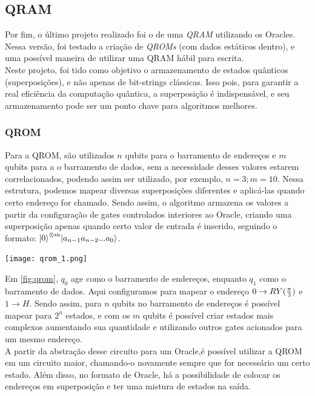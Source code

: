 \documentclass{article}
\begin{document}
\subsection{QRAM} \label{qram}
Por fim, o último projeto realizado foi o de uma \emph{QRAM} utilizando os Oracles. Nessa versão, foi testado a criação de \emph{QROMs} (com dados estáticos dentro), e uma possível maneira de utilizar uma QRAM hábil para escrita.\\
Neste projeto, foi tido como objetivo o armazenamento de estados quânticos (superposições), e não apenas de bit-strings clássicas. Isso pois, para garantir a real eficiência da computação quântica, a superposição é indispensável, e seu armazenamento pode ser um ponto chave para algoritmos melhores.

\subsubsection{QROM}
Para a QROM, são utilizados $n$ qubits para o barramento de endereços e $m$ qubits para a o barramento de dados, sem a necessidade desses valores estarem correlacionados, podendo assim ser utilizado, por exemplo, $n=3; m=10$. Nessa estrutura, podemos mapear diversas superposições diferentes e aplicá-las quando certo endereço for chamado. Sendo assim, o algoritmo armazena os valores a partir da configuração de gates controlados interiores ao Oracle, criando uma superposição apenas quando certo valor de entrada é inserido, seguindo o formato: ${\ket{0}^{\otimes m}} {\ket{a_{n-1} a_{n-2} ... a_0}}$.

\begin{center}
	\texttt{[image: qrom\_1.png]}
	\label{fig:qrom}
\end{center}


Em \ref{fig:qrom}, $q_{0}$ age como o barramento de endereços, enquanto $q_{1}$ como o barramento de dados. Aqui configuramos para mapear o endereço $0 \to RY({\pi\over{3}})$ e $1 \to H$. Sendo assim, para $n$ qubits no barramento de endereços é possível mapear para $2^{n}$ estados, e com os $m$ qubits é possível criar estados mais complexos aumentando sua quantidade e utilizando outros gates acionados para um mesmo endereço. \\
A partir da abstração desse circuito para um Oracle,é possível utilizar a QROM em um circuito maior, chamando-o novamente sempre que for necessário um certo estado. Além disso, no formato de Oracle, há a possibilidade de colocar os endereços em superposição e ter uma mistura de estados na saída.
\end{document}
